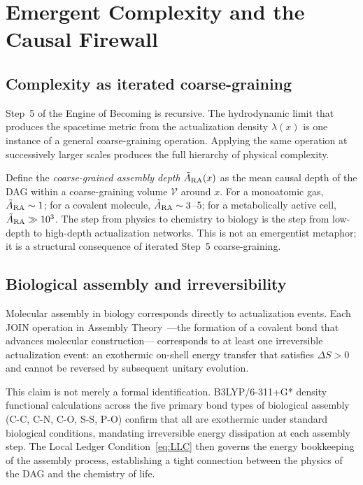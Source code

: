 \documentclass[11pt,twocolumn]{article}
\theoremstyle{plain}
\theoremstyle{remark}
\begin{document}
\section{Emergent Complexity and the Causal Firewall}
\label{sec:complexity}

\subsection{Complexity as iterated coarse-graining}

Step~5 of the Engine of Becoming is recursive.
The hydrodynamic limit that produces the spacetime metric from
the actualization density $\lambda(x)$ is one instance of a
general coarse-graining operation.
Applying the same operation at successively larger scales produces
the full hierarchy of physical complexity.

Define the \emph{coarse-grained assembly depth} $\tilde{A}_{\rm RA}(x)$
as the mean causal depth of the DAG within a coarse-graining volume
$\mathcal{V}$ around $x$.
For a monoatomic gas, $\tilde{A}_{\rm RA} \sim 1$; for a covalent
molecule, $\tilde{A}_{\rm RA} \sim 3$--$5$; for a metabolically
active cell, $\tilde{A}_{\rm RA} \gg 10^3$.
The step from physics to chemistry to biology is the step from
low-depth to high-depth actualization networks.
This is not an emergentist metaphor; it is a structural consequence
of iterated Step~5 coarse-graining.

\subsection{Biological assembly and irreversibility}

Molecular assembly in biology corresponds directly to actualization
events.
Each JOIN operation in Assembly Theory~\cite{Cronin2023}---the
formation of a covalent bond that advances molecular construction---
corresponds to at least one irreversible actualization event:
an exothermic on-shell energy transfer that satisfies
$\Delta S > 0$ and cannot be reversed by subsequent unitary evolution.

This claim is not merely a formal identification.
B3LYP/6-311+G* density functional calculations across the five
primary bond types of biological assembly (C-C, C-N, C-O, S-S, P-O)
confirm that all are exothermic under standard biological conditions,
mandating irreversible energy dissipation at each assembly step.
The Local Ledger Condition~\eqref{eq:LLC} then governs the energy
bookkeeping of the assembly process, establishing a tight connection
between the physics of the DAG and the chemistry of life.
\end{document}
